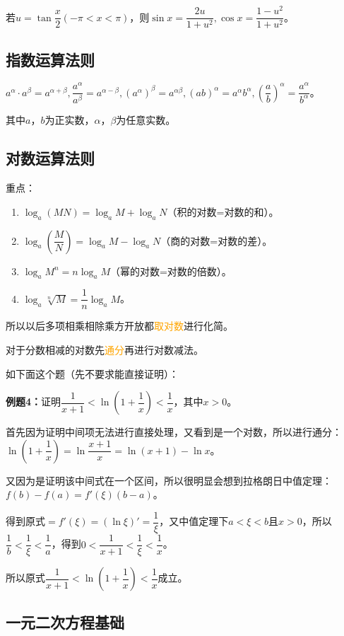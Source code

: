 \documentclass[UTF8, 12pt]{ctexart}
\begin{document}
若$u=\tan\dfrac{x}{2}(-\pi<x<\pi)$，则$\sin x=\dfrac{2u}{1+u^2},\cos x=\dfrac{1-u^2}{1+u^2}$。

\subsection{指数运算法则}

$a^\alpha\cdot a^\beta=a^{\alpha+\beta},\dfrac{a^\alpha}{a^\beta}=a^{\alpha-\beta},(a^\alpha)^\beta=a^{\alpha\beta},(ab)^\alpha=a^\alpha b^\alpha,(\dfrac{a}{b})^\alpha=\dfrac{a^\alpha}{b^\alpha}$。

其中$a$，$b$为正实数，$\alpha$，$\beta$为任意实数。

\subsection{对数运算法则}

重点：

\begin{enumerate}
    \item $\log_a(MN)=\log_aM+\log_aN$（积的对数=对数的和）。
    \item $\log_a(\dfrac{M}{N})=\log_aM-\log_aN$（商的对数=对数的差）。
    \item $\log_aM^n=n\log_aM$（幂的对数=对数的倍数）。
    \item $\log_a\sqrt[n]{M}=\dfrac{1}{n}\log_aM$。
\end{enumerate}

所以以后多项相乘相除乘方开放都\textcolor{orange}{取对数}进行化简。

对于分数相减的对数先\textcolor{orange}{通分}再进行对数减法。

如下面这个题（先不要求能直接证明）：

\textbf{例题4：}证明$\dfrac{1}{x+1}<\ln(1+\dfrac{1}{x})<\dfrac{1}{x}$，其中$x>0$。

首先因为证明中间项无法进行直接处理，又看到是一个对数，所以进行通分：$\ln(1+\dfrac{1}{x})=\ln\dfrac{x+1}{x}=\ln(x+1)-\ln x$。

又因为是证明该中间式在一个区间，所以很明显会想到拉格朗日中值定理：$f(b)-f(a)=f'(\xi)(b-a)$。

得到原式$=f'(\xi)=(\ln\xi)'=\dfrac{1}{\xi}$，又中值定理下$a<\xi<b$且$x>0$，所以$\dfrac{1}{b}<\dfrac{1}{\xi}<\dfrac{1}{a}$，得到$0<\dfrac{1}{x+1}<\dfrac{1}{\xi}<\dfrac{1}{x}$。

所以原式$\dfrac{1}{x+1}<\ln(1+\dfrac{1}{x})<\dfrac{1}{x}$成立。

\subsection{一元二次方程基础}
\end{document}
